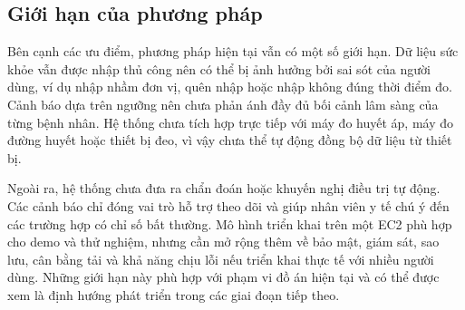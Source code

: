 \subsection{Giới hạn của phương pháp}
\par Bên cạnh các ưu điểm, phương pháp hiện tại vẫn có một số giới hạn. Dữ liệu sức khỏe vẫn được nhập thủ công nên có thể bị ảnh hưởng bởi sai sót của người dùng, ví dụ nhập nhầm đơn vị, quên nhập hoặc nhập không đúng thời điểm đo. Cảnh báo dựa trên ngưỡng nên chưa phản ánh đầy đủ bối cảnh lâm sàng của từng bệnh nhân. Hệ thống chưa tích hợp trực tiếp với máy đo huyết áp, máy đo đường huyết hoặc thiết bị đeo, vì vậy chưa thể tự động đồng bộ dữ liệu từ thiết bị.

\par Ngoài ra, hệ thống chưa đưa ra chẩn đoán hoặc khuyến nghị điều trị tự động. Các cảnh báo chỉ đóng vai trò hỗ trợ theo dõi và giúp nhân viên y tế chú ý đến các trường hợp có chỉ số bất thường. Mô hình triển khai trên một EC2 phù hợp cho demo và thử nghiệm, nhưng cần mở rộng thêm về bảo mật, giám sát, sao lưu, cân bằng tải và khả năng chịu lỗi nếu triển khai thực tế với nhiều người dùng. Những giới hạn này phù hợp với phạm vi đồ án hiện tại và có thể được xem là định hướng phát triển trong các giai đoạn tiếp theo.
